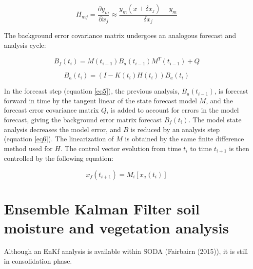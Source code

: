 \begin{equation}
H_{mj} = \frac{\partial {y}_m}{\partial {x}_j} \approx \frac{ {y}_m(x+\delta x_j)-y_m}{ \delta {x}_j}
\end{equation}

The background error covariance matrix undergoes an analogous forecast and analysis cycle:

\begin{equation} \label{eq5}
B_f(t_i) = M(t_{i-1}) B_a(t_{i-1}) M^T(t_{i-1}) + Q
\end{equation}

\begin{equation} \label{eq6}
B_a(t_i) = (I-K(t_i)H(t_i)) B_a(t_{i})
\end{equation}

In the forecast step (equation \ref{eq5}), the previous analysis, $B_a (t_{i-1})$, is forecast forward in time by the tangent linear of the state forecast model $M$, and the forecast error covariance matrix $Q$, is added to account for errors in the model forecast, giving the background error matrix forecast $B_f (t_i)$. The model state analysis decreases the model error, and $B$ is reduced by an analysis step (equation \ref{eq6}). The linearization of $M$ is obtained by the same finite difference method used for $H$.
The control vector evolution from time $t_i$ to time $t_{i+1}$ is then controlled by the following equation:


\begin{equation} \label{eq7}
x_f(t_{i+1}) = M_i[x_a(t_{i})]
\end{equation}

\section{Ensemble Kalman Filter soil moisture and vegetation analysis}

Although an EnKf analysis is available within SODA (Fairbairn \etal (2015)\nocite{fairbairn_2015}), it is still in consolidation phase.


